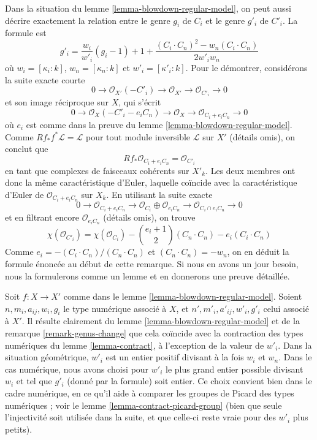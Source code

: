 \begin{remark}
\label{remark-genus-change}
Dans la situation du lemme \ref{lemma-blowdown-regular-model}, on peut aussi
décrire exactement la relation entre le genre $g_i$ de $C_i$ et le genre
$g'_i$ de $C'_i$. La formule est
$$
g'_i = \frac{w_i}{w'_i}(g_i - 1) + 1 +
\frac{(C_i \cdot C_n)^2 - w_n(C_i \cdot C_n)}{2w'_iw_n}
$$
où $w_i = [\kappa_i : k]$, $w_n = [\kappa_n : k]$ et
$w'_i = [\kappa'_i : k]$.
Pour le démontrer, considérons la suite exacte courte
$$
0 \to \mathcal{O}_{X'}(-C'_i) \to \mathcal{O}_{X'} \to
\mathcal{O}_{C'_i} \to 0
$$
et son image réciproque sur $X$, qui s'écrit
$$
0 \to \mathcal{O}_X(-C'_i - e_iC_n) \to \mathcal{O}_X \to
\mathcal{O}_{C_i + e_iC_n} \to 0
$$
où $e_i$ est comme dans la preuve du lemme
\ref{lemma-blowdown-regular-model}. Comme
$Rf_*f^*\mathcal{L} = \mathcal{L}$ pour tout module inversible
$\mathcal{L}$ sur $X'$ (détails omis), on conclut que
$$
Rf_*\mathcal{O}_{C_i + e_iC_n} = \mathcal{O}_{C'_i}
$$
en tant que complexes de faisceaux cohérents sur $X'_k$.
Les deux membres ont donc la même caractéristique d'Euler, laquelle coïncide
avec la caractéristique d'Euler de $\mathcal{O}_{C_i + e_iC_n}$ sur $X_k$.
En utilisant la suite exacte
$$
0 \to \mathcal{O}_{C_i + e_iC_n} \to
\mathcal{O}_{C_i} \oplus \mathcal{O}_{e_iC_n} \to
\mathcal{O}_{C_i \cap e_iC_n} \to 0
$$
et en filtrant encore $\mathcal{O}_{e_iC_n}$ (détails omis), on trouve
$$
\chi(\mathcal{O}_{C'_i}) =
\chi(\mathcal{O}_{C_i}) - {e_i + 1 \choose 2}(C_n \cdot C_n)
- e_i(C_i \cdot C_n)
$$
Comme $e_i = -(C_i \cdot C_n)/(C_n \cdot C_n)$ et
$(C_n \cdot C_n) = -w_n$, on en déduit la formule énoncée au début de
cette remarque. Si nous en avons un jour besoin, nous la formulerons comme
un lemme et en donnerons une preuve détaillée.
\end{remark}

\begin{remark}
\label{remark-compare-contractions}
Soit $f : X \to X'$ comme dans le lemme
\ref{lemma-blowdown-regular-model}. Soient $n, m_i, a_{ij}, w_i, g_i$ le type
numérique associé à $X$, et $n', m'_i, a'_{ij}, w'_i, g'_i$ celui associé à
$X'$. Il résulte clairement du lemme \ref{lemma-blowdown-regular-model} et
de la remarque \ref{remark-genus-change} que cela coïncide avec la
contraction des types numériques du lemme \ref{lemma-contract}, à
l'exception de la valeur de $w'_i$. Dans la situation géométrique, $w'_i$
est un entier positif divisant à la fois $w_i$ et $w_n$. Dans le cas
numérique, nous avons choisi pour $w'_i$ le plus grand entier possible
divisant $w_i$ et tel que $g'_i$ (donné par la formule) soit entier.
Ce choix convient bien dans le cadre numérique, en ce qu'il aide à comparer
les groupes de Picard des types numériques ; voir le lemme
\ref{lemma-contract-picard-group} (bien que seule l'injectivité soit
utilisée dans la suite, et que celle-ci reste vraie pour des $w'_i$ plus
petits).
\end{remark}

